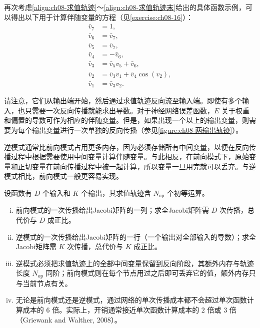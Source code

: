 \documentclass[../../main.tex]{subfiles}
\begin{document}
再次考虑\eqref{align:ch08-求值轨迹}～\eqref{align:ch08-求值轨迹末}给出的具体函数示例，可以得出以下用于计算伴随变量的方程（见\cref{exercise:ch08-16}）：
\begin{align}
\bar{v}_7&=1,\label{align:ch08-伴随轨迹}\\
\bar{v}_6&=\bar{v}_7,\nonumber\\
\bar{v}_5&=\bar{v}_7,\nonumber\\
\bar{v}_4&=-\bar{v}_6,\nonumber\\
\bar{v}_3&=\bar{v}_5v_5+\bar{v}_6,\nonumber\\
\bar{v}_2&=\bar{v}_3v_1+\bar{v}_4\cos\left(v_2\right),\nonumber\\
\bar{v}_1&=\bar{v}_3v_2.
\label{align:ch08-伴随轨迹末}
\end{align}

请注意，它们从输出端开始，然后通过求值轨迹反向流至输入端。即使有多个输入，也只需要一次反向传播就能求出导数。对于神经网络误差函数，$E$ 关于权重和偏置的导数可作为相应的伴随变量。但是，如果出现一个以上的输出变量，则需要为每个输出变量进行一次单独的反向传播（参见\cref{figure:ch08-两输出轨迹}）。

逆模式通常比前向模式占用更多内存，因为必须存储所有中间变量，以便在反向传播过程中根据需要使用中间变量计算伴随变量。与此相反，在前向模式下，原始变量和正切变量在前向传播过程中被一起计算，所以变量一旦用完就可以丢弃。与逆模式相比，前向模式一般更容易实现。

\begin{proposition}[前向模式与逆模式的代价比较]\label{proposition:ch08-模式代价}
设函数有 $D$ 个输入和 $K$ 个输出，其求值轨迹含 $N_{\mathrm{op}}$ 个初等运算。
\begin{enumerate}[(i)]
\item\label{item:ch08-前向代价}前向模式的一次传播给出Jacobi矩阵的一列；求全Jacobi矩阵需 $D$ 次传播，总代价与 $D$ 成正比。
\item\label{item:ch08-逆代价}逆模式的一次传播给出Jacobi矩阵的一行（一个输出对全部输入的导数）；求全Jacobi矩阵需 $K$ 次传播，总代价与 $K$ 成正比。
\item\label{item:ch08-内存代价}逆模式必须把求值轨迹上的全部中间变量保留到反向阶段，其额外内存与轨迹长度 $N_{\mathrm{op}}$ 同阶；前向模式则在每个节点用过之后即可丢弃它的值，额外内存只与当前节点有关。
\item\label{item:ch08-常数因子}无论是前向模式还是逆模式，通过网络的单次传播成本都不会超过单次函数计算成本的 $6$ 倍。实际上，开销通常接近单次函数计算成本的 $2$ 倍或 $3$ 倍（Griewank and Walther, 2008）。
\end{enumerate}
\end{proposition}
\end{document}
